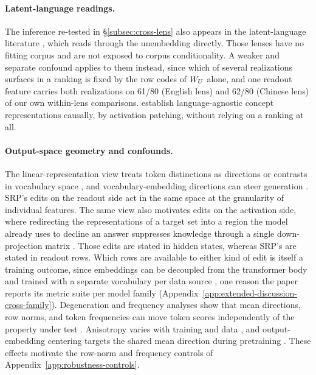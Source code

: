\paragraph{Latent-language readings.}
The inference re-tested in \S\ref{subsec:cross-lens} also appears in the
latent-language literature \citep{wendler2024llamas,schut2025english},
which reads through the unembedding directly. Those lenses have no
fitting corpus and are not exposed to corpus conditionality. A weaker
and separate confound applies to them instead, since which of several
realizations surfaces in a ranking is fixed by the row codes of \(W_U\)
alone, and one readout feature carries both realizations on 61/80
(English lens) and 62/80 (Chinese lens) of our own within-lens comparisons.
\citet{dumas2025tongue} establish language-agnostic concept
representations causally, by activation patching, without relying on a
ranking at all.

\paragraph{Output-space geometry and confounds.}
The linear-representation view treats token distinctions as directions or
contrasts in vocabulary space \citep{park2024linear}, and
vocabulary-embedding directions can steer generation \citep{han2024word}.
SRP's edits on the readout side act in the same space at the granularity of individual features.
The same view also motivates edits on the activation side, where redirecting
the representations of a target set into a region the model already uses to
decline an answer suppresses knowledge through a single down-projection matrix
\citep{shen2025lunar}. Those edits are stated in hidden states, whereas SRP's
are stated in readout rows.
Which rows are available to either kind of edit is itself a training
outcome, since embeddings can be decoupled from the
transformer body and trained with a separate vocabulary per data source
\citep{iacob2025dept}, one reason the paper reports its metric suite per model
family (Appendix~\ref{app:extended-discussion-cross-family}).
Degeneration and frequency analyses show that mean directions, row norms,
and token frequencies can move token scores independently of the property
under test \citep{gao2019representation,zhang2020revisiting,chung2025exploiting}.
Anisotropy varies with training and data \citep{machina2024anisotropy}, and
output-embedding centering targets the shared mean direction during
pretraining \citep{stollenwerk2026output}. These effects motivate the
row-norm and frequency controls of
Appendix~\ref{app:robustness-controls}.

